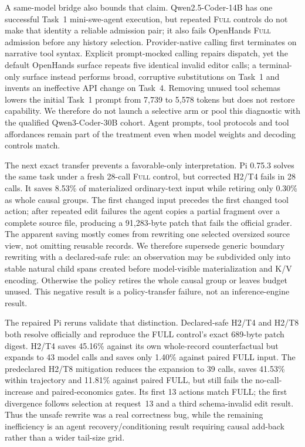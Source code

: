 \documentclass[11pt]{article}
\begin{document}
A same-model bridge also bounds that claim.  Qwen2.5-Coder-14B has one
successful Task~1 mini-swe-agent execution, but repeated \textsc{Full}
controls do not make that identity a reliable admission pair; it also fails
OpenHands \textsc{Full} admission before any history selection.
Provider-native calling first terminates on narrative tool
syntax.  Explicit prompt-mocked calling repairs dispatch, yet the default
OpenHands surface repeats five identical invalid editor calls; a terminal-only
surface instead performs broad, corruptive substitutions on Task~1 and invents
an ineffective API change on Task~4.  Removing unused tool schemas lowers the
initial Task~1 prompt from 7,739 to 5,578 tokens but does not restore
capability.  We therefore do not launch a selective arm or pool this diagnostic
with the qualified Qwen3-Coder-30B cohort.  Agent prompts, tool protocols and
tool affordances remain part of the treatment even when model weights and
decoding controls match.

The next exact transfer prevents a favorable-only interpretation.  Pi 0.75.3
solves the same task under a fresh 28-call \textsc{Full} control, but corrected
H2/T4 fails in 28 calls.  It saves 8.53\% of materialized ordinary-text input
while retiring only 0.30\% as whole causal groups.  The first changed input
precedes the first changed tool action; after repeated edit failures the agent
copies a partial fragment over a complete source file, producing a 91,283-byte
patch that fails the official grader.  The apparent saving mostly comes from
rewriting one selected oversized source view, not omitting reusable records.
We therefore supersede generic boundary rewriting with a declared-safe rule:
an observation may be subdivided only into stable natural child spans created
before model-visible materialization and K/V encoding.  Otherwise the policy
retires the whole causal group or leaves budget unused.  This negative result
is a policy-transfer failure, not an inference-engine result.

The repaired Pi reruns validate that distinction.  Declared-safe H2/T4 and
H2/T8 both resolve officially and reproduce the FULL control's exact 689-byte
patch digest.  H2/T4 saves 45.16\% against its own whole-record counterfactual
but expands to 43 model calls and saves only 1.40\% against paired FULL input.
The predeclared H2/T8 mitigation reduces the expansion to 39 calls, saves
41.53\% within trajectory and 11.81\% against paired FULL, but still fails the
no-call-increase and paired-economics gates.  Its first 13 actions match FULL;
the first divergence follows selection at request~13 and a third schema-invalid
edit result.  Thus the unsafe rewrite was a real correctness bug, while the
remaining inefficiency is an agent recovery/conditioning result requiring
causal add-back rather than a wider tail-size grid.
\end{document}

